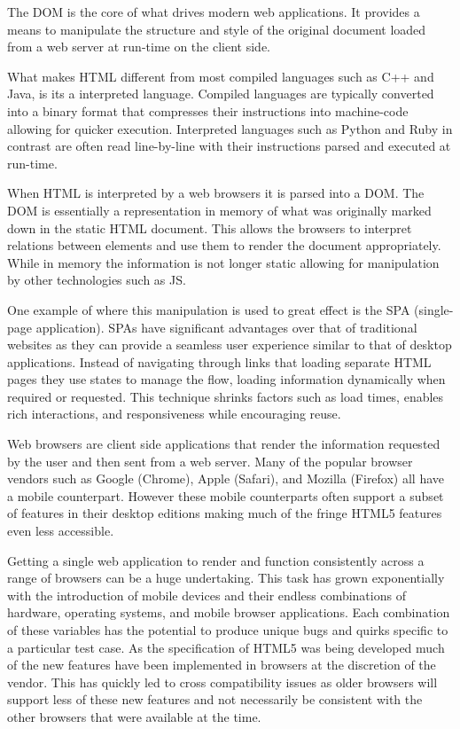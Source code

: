 \documentclass[final]{cmpreport}
\begin{document}
The DOM is the core of what drives modern web applications. It provides a means to manipulate the structure and style of the original document loaded from a web server at run-time on the client side.

What makes HTML different from most compiled languages such as C++ and Java, is its a interpreted language. Compiled languages are typically converted into a binary format that compresses their instructions into machine-code allowing for quicker execution. Interpreted languages such as Python and Ruby in contrast are often read line-by-line with their instructions parsed and executed at run-time.

When HTML is interpreted by a web browsers it is parsed into a DOM. The DOM is essentially a representation in memory of what was originally marked down in the static HTML document. This allows the browsers to interpret relations between elements and use them to render the document appropriately. While in memory the information is not longer static allowing for manipulation by other technologies such as JS.

One example of where this manipulation is used to great effect is the SPA (single-page application). SPAs have significant advantages over that of traditional websites as they can provide a seamless user experience similar to that of desktop applications. Instead of navigating through links that loading separate HTML pages they use states to manage the flow, loading information dynamically when required or requested. This technique shrinks factors such as load times, enables rich interactions, and responsiveness while encouraging reuse. \citep{Takada}

Web browsers are client side applications that render the information requested by the user and then sent from a web server. Many of the popular browser vendors such as Google (Chrome), Apple (Safari), and Mozilla (Firefox) all have a mobile counterpart. However these mobile counterparts often support a subset of features in their desktop editions making much of the fringe HTML5 features even less accessible.

Getting a single web application to render and function consistently across a range of browsers can be a huge undertaking. This task has grown exponentially with the introduction of mobile devices and their endless combinations of hardware, operating systems, and mobile browser applications. Each combination of these variables has the potential to produce unique bugs and quirks specific to a particular test case. As the specification of HTML5 was being developed much of the new features have been implemented in browsers at the discretion of the vendor. This has quickly led to cross compatibility issues as older browsers will support less of these new features and not necessarily be consistent with the other browsers that were available at the time.
\end{document}
